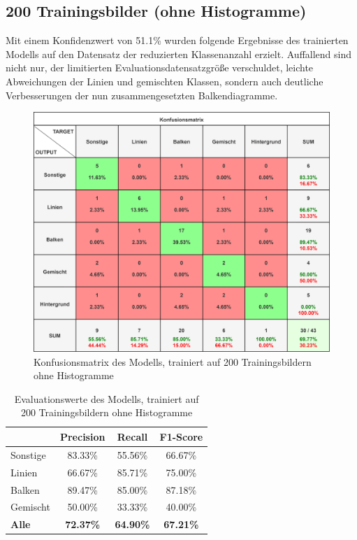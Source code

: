 \subsection*{200 Trainingsbilder (ohne Histogramme)}
Mit einem Konfidenzwert von 51.1\% wurden folgende Ergebnisse des trainierten Modells auf den Datensatz der reduzierten Klassenanzahl erzielt. Auffallend sind nicht nur, der limitierten Evaluationsdatensatzgröße verschuldet, leichte Abweichungen der Linien und gemischten Klassen, sondern auch deutliche Verbesserungen der nun zusammengesetzten Balkendiagramme.

\begin{figure}[H]
    \centering
    \captionsetup{width=1\linewidth}
    \includegraphics[width=1\textwidth]{Experimente/img/detect/2_val@0.511_200_nohisto/konfusionsmatrix.png}
    \caption{ Konfusionsmatrix des Modells, trainiert auf 200 Trainingsbildern ohne Histogramme}
    \label{fig:extraction_output}
\end{figure}

\begin{table}[H]
    \centering
    \begin{tabular}{|l|c|c|c|}
        \hline
        \rowcolor[HTML]{EFEFEF}
                      & Precision        & Recall           & F1-Score         \\ \hline
        Sonstige      & 83.33\%          & 55.56\%          & 66.67\%          \\ \hline
        Linien        & 66.67\%          & 85.71\%          & 75.00\%          \\ \hline
        Balken        & 89.47\%          & 85.00\%          & 87.18\%          \\ \hline
        Gemischt      & 50.00\%          & 33.33\%          & 40.00\%          \\ \hline
        \textbf{Alle} & \textbf{72.37\%} & \textbf{64.90\%} & \textbf{67.21\%} \\ \hline
    \end{tabular}
    \caption{Evaluationswerte des Modells, trainiert auf 200 Trainingsbildern ohne Histogramme}
\end{table}

